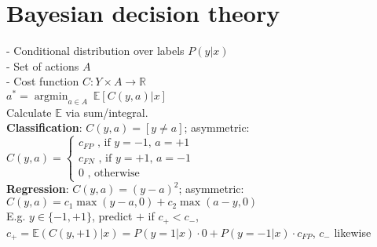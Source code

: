\section*{Bayesian decision theory}
- Conditional distribution over labels $P(y|x)$\\
- Set of actions $A$\\
- Cost function $C:Y\times {A} \rightarrow \mathbb{R}$\\
$a^* = {\operatorname{argmin}_{a \in {A}}} ~ \mathbb{E}[C(y,a)|x]$\\
Calculate $\mathbb{E}$ via sum/integral.\\
\textbf{Classification}: $C(y,a) = [y \not = a]$; asymmetric: \\
$C(y,a) =
 \begin{cases}
 	c_{FP} \text{ , if $y=-1$, $a=+1$}\\
		c_{FN} \text{ , if $y=+1$, $a=-1$}\\
		0 \text{ , otherwise}
 \end{cases}$\\
 \textbf{Regression}:  $C(y,a) = (y-a)^2$; asymmetric: $C(y,a) = c_1 \max(y-a,0) + c_2 \max(a-y,0)$\\
E.g. $y \in \{-1,+1\}$, predict $+$ if $c_+ < c_-$, $c_+ = \mathbb{E}(C(y, +1)|x) = P(y = 1|x) \cdot 0 + P(y = -1|x) \cdot c_{FP}$, $c_-$ likewise



